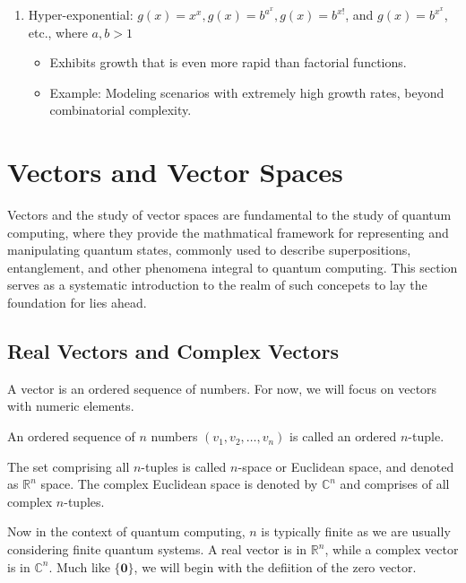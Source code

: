 \documentclass[12pt]{article}
\begin{document}
\begin{enumerate}
    \item Hyper-exponential: $g(x) = x^x, g(x) = b^{a^x}, g(x) = b^{x!}$, and $g(x) = b^{x^x}$, etc., where $a, b > 1$
    \begin{itemize}
        \item Exhibits growth that is even more rapid than factorial functions.
        
        \item Example: Modeling scenarios with extremely high growth rates, beyond combinatorial complexity.
    \end{itemize}
\end{enumerate}

\break


\section{Vectors and Vector Spaces}

Vectors and the study of vector spaces are fundamental to the study of quantum computing, where they provide the mathmatical framework for representing and manipulating quantum states, commonly used to describe superpositions, entanglement, and other phenomena integral to quantum computing. This section serves as a systematic introduction to the realm of such concepets to lay the foundation for lies ahead. 

\subsection{Real Vectors and Complex Vectors}

A vector is an ordered sequence of numbers. For now, we will focus on vectors with numeric elements. 

\begin{definition}
    An ordered sequence of $n$ numbers $(v_1, v_2, \ldots, v_n)$ is called an ordered $n$-tuple. 
\end{definition}

\begin{definition}
    The set comprising all $n$-tuples is called $n$-space or Euclidean space, and denoted as $\mathbb{R}^n$ space. The complex Euclidean space is denoted by $\mathbb{C}^n$ and comprises of all complex $n$-tuples. 
\end{definition}

Now in the context of quantum computing, $n$ is typically finite as we are usually considering finite quantum systems. A real vector is in $\mathbb{R}^n$, while a complex vector is in $\mathbb{C}^n$. Much like $\{\mathbf{0}\}$, we will begin with the defiition of the zero vector.
\end{document}
